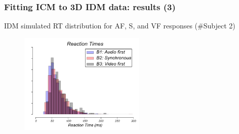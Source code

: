 \documentclass[xcolor={fixpdftex,hyperref,x11names},10pt,pdftex,hyperref={pdftex}]{beamer}
\begin{document}
\begin{frame}
  \frametitle{Fitting ICM to 3D IDM data: results (3)}
  IDM simulated RT distribution for AF, S, and VF responses (\#Subject 2)
   \begin{figure}[h]
    \includegraphics[width=60mm,totalheight=0.65\textheight]{figs/sub2_reaction_times2.pdf}
    \end{figure}
\end{frame}




\end{document}
